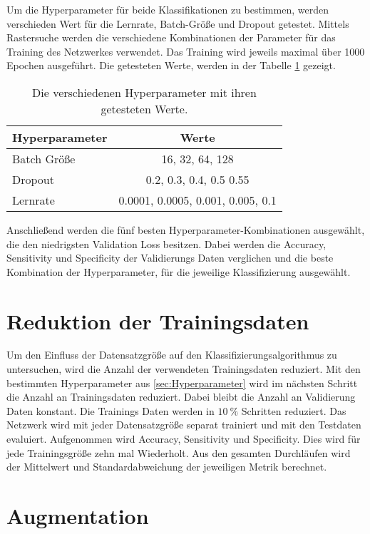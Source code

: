 Um die Hyperparameter für beide Klassifikationen zu bestimmen, werden verschieden Wert für die
Lernrate, Batch-Größe und Dropout getestet.
Mittels Rastersuche werden die verschiedene Kombinationen der Parameter für das Training des Netzwerkes verwendet. 
Das Training wird jeweils maximal über 1000 Epochen ausgeführt.
Die getesteten Werte, werden in der Tabelle \ref{tab:Hypp} gezeigt.

\begin{table}[htbp]
    \centering
    \begin{tabular}{l c }
        \hline
        Hyperparameter     & Werte \\
        \hline
        Batch Größe    & 16, 32, 64, 128   \\
        Dropout        & 0.2, 0.3, 0.4, 0.5 0.55   \\
        Lernrate       & 0.0001, 0.0005, 0.001, 0.005, 0.1   \\
        \hline
  \end{tabular}
  \caption{Die verschiedenen Hyperparameter mit ihren getesteten Werte.}
  \label{tab:Hypp}
\end{table}


Anschließend werden die fünf besten Hyperparameter-Kombinationen ausgewählt, die den niedrigsten Validation Loss besitzen.
Dabei werden die Accuracy, Sensitivity und Specificity der Validierungs Daten verglichen und die beste Kombination der Hyperparameter, 
für die jeweilige Klassifizierung ausgewählt.  

\section{Reduktion der Trainingsdaten}\label{sec:Red1}
Um den Einfluss der Datensatzgröße auf den Klassifizierungsalgorithmus zu untersuchen, wird die Anzahl der verwendeten Trainingsdaten reduziert.
Mit den bestimmten Hyperparameter aus \ref{sec:Hyperparameter} wird im nächsten Schritt die Anzahl an Trainingsdaten reduziert.
Dabei bleibt die Anzahl an Validierung Daten konstant.
Die Trainings Daten werden in $\qty{10}{\%}$ Schritten reduziert. 
Das Netzwerk wird mit jeder Datensatzgröße separat trainiert und mit den Testdaten evaluiert. 
Aufgenommen wird Accuracy, Sensitivity und Specificity.
Dies wird für jede Trainingsgröße zehn mal Wiederholt.
Aus den gesamten Durchläufen wird der Mittelwert und Standardabweichung der jeweiligen Metrik berechnet.

\section{Augmentation}

